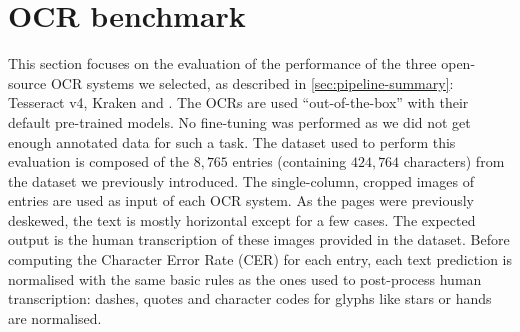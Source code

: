 \section{OCR benchmark}
\label{sec:ocr-xp}

This section focuses on the evaluation of the performance of the three open-source OCR systems we selected, as described
in \cref{sec:pipeline-summary}: Tesseract v4, Kraken and \peroocr. The OCRs are used ``out-of-the-box'' with their
default pre-trained models. No fine-tuning was performed as we did not get enough annotated data for such a task. The
dataset used to perform this evaluation is composed of the $8,765$ entries (containing $424,764$ characters) from the
dataset we previously introduced. The single-column, cropped images of entries are used as input of each OCR system. As
the pages were previously deskewed, the text is mostly horizontal except for a few cases. The expected output is the
human transcription of these images provided in the dataset. Before computing the Character Error Rate (CER) for each
entry, each text prediction is normalised with the same basic rules as the ones used to post-process human
transcription: dashes, quotes and character codes for glyphs like stars or hands are normalised.



